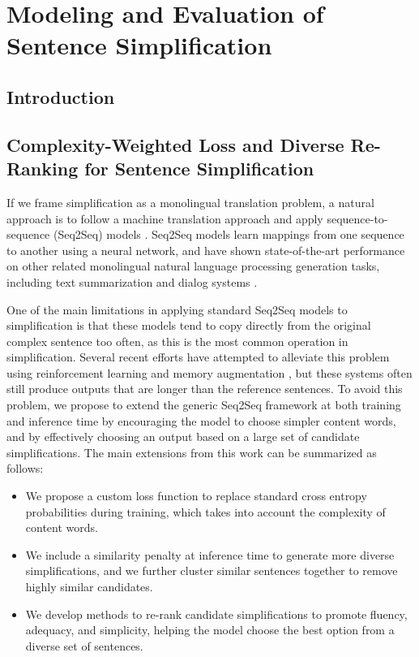 \documentclass[thesis.tex]{subfiles}
\begin{document}
\chapter{Modeling and Evaluation of Sentence Simplification}
\label{chap:sentence}

\section{Introduction}


\section{Complexity-Weighted Loss and Diverse Re-Ranking for Sentence Simplification} \label{sec:sentence}

If we frame simplification as a monolingual translation problem, a natural approach is to follow a machine translation approach and apply sequence-to-sequence (Seq2Seq) models  \citep{sutskever2014sequence,luong2015effective,vaswani2017attention}. Seq2Seq models learn mappings from one sequence to another using a neural network, and have shown state-of-the-art performance on other related monolingual natural language processing generation tasks, including text summarization \citep{nallapati2016abstractive} and dialog systems \citep{vinyals2015neural}. 

One of the main limitations in applying standard Seq2Seq models to simplification is that these models tend to copy directly from the original complex sentence too often, as this is the most common operation in simplification. Several recent efforts have attempted to alleviate this problem using reinforcement learning \citep{zhang2017sentence} and memory augmentation \citep{zhao2018integrating}, but these systems often still produce outputs that are longer than the reference sentences. To avoid this problem, we propose to extend the generic Seq2Seq framework at both training and inference time by encouraging the model to choose simpler content words, and by effectively choosing an output based on a large set of candidate simplifications. The main extensions from this work can be summarized as follows:

\begin{itemize}
    \item We propose a custom loss function to replace standard cross entropy probabilities during training, which takes into account the complexity of content words.
    \item We include a similarity penalty at inference time to generate more diverse simplifications, and we further cluster similar sentences together to remove highly similar candidates.
    \item We develop methods to re-rank candidate simplifications to promote fluency, adequacy, and simplicity, helping the model choose the best option from a diverse set of sentences.
\end{itemize}
\end{document}
